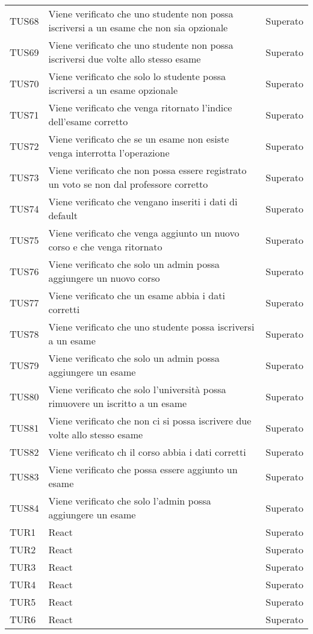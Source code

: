 \documentclass[PianoDiQualifica.tex]{subfiles}
\begin{document}
\begin{longtable}[H]{P{2cm}P{8.5cm}P{3cm}}
	TUS68 & Viene verificato che uno studente non possa iscriversi a un esame che non sia opzionale & Superato \\
	TUS69 & Viene verificato che uno studente non possa iscriversi due volte allo stesso esame & Superato \\
	TUS70 & Viene verificato che solo lo studente possa iscriversi a un esame opzionale & Superato \\
	TUS71 & Viene verificato che venga ritornato l'indice dell'esame corretto & Superato \\
	TUS72 & Viene verificato che se un esame non esiste venga interrotta l'operazione & Superato \\
	TUS73 & Viene verificato che non possa essere registrato un voto se non dal professore corretto & Superato \\
	TUS74 & Viene verificato che vengano inseriti i dati di default & Superato \\
	TUS75 & Viene verificato che venga aggiunto un nuovo corso e che venga ritornato & Superato \\
	TUS76 & Viene verificato che solo un admin possa aggiungere un nuovo corso & Superato \\
	TUS77 & Viene verificato che un esame abbia i dati corretti & Superato \\
	TUS78 & Viene verificato che uno studente possa iscriversi a un esame & Superato \\
	TUS79 & Viene verificato che solo un admin possa aggiungere un esame & Superato \\
	TUS80 & Viene verificato che solo l'università possa rimuovere un iscritto a un esame & Superato \\
	TUS81 & Viene verificato che non ci si possa iscrivere due volte allo stesso esame & Superato \\
	TUS82 & Viene verificato ch il corso abbia i dati corretti & Superato \\
	TUS83 & Viene verificato che possa essere aggiunto un esame & Superato \\
	TUS84 & Viene verificato che solo l'admin possa aggiungere un esame & Superato \\
	\hhline{===}
	TUR1 & React & Superato \\ 
	TUR2 & React & Superato \\ 
	TUR3 & React & Superato \\ 
	TUR4 & React & Superato \\ 
	TUR5 & React & Superato \\ 
	TUR6 & React & Superato \\ 

\end{longtable}
\end{document}
